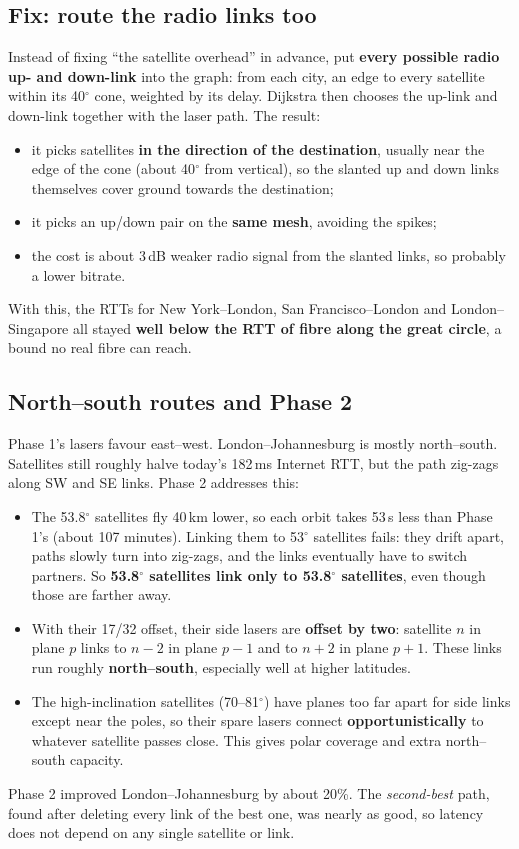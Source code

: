 \subsection{Fix: route the radio links too}
Instead of fixing ``the satellite overhead'' in advance, put \textbf{every possible radio up- and down-link} into the graph: from each city, an edge to every satellite
within its 40$^\circ$ cone, weighted by its delay. Dijkstra then chooses the up-link and down-link together with the laser path. The result:
\begin{itemize}
  \item it picks satellites \textbf{in the direction of the destination}, usually near the edge of the cone (about 40$^\circ$ from vertical), so the slanted up and down
        links themselves cover ground towards the destination;
  \item it picks an up/down pair on the \textbf{same mesh}, avoiding the spikes;
  \item the cost is about 3\,dB weaker radio signal from the slanted links, so probably a lower bitrate.
\end{itemize}
With this, the RTTs for New York--London, San Francisco--London and London--Singapore all stayed \textbf{well below the RTT of fibre along the great circle},
a bound no real fibre can reach.

\subsection{North--south routes and Phase 2}
Phase 1's lasers favour east--west. London--Johannesburg is mostly north--south. Satellites still roughly halve today's 182\,ms Internet RTT, but the path zig-zags
along SW and SE links. Phase 2 addresses this:
\begin{itemize}
  \item The 53.8$^\circ$ satellites fly 40\,km lower, so each orbit takes 53\,s less than Phase 1's (about 107 minutes). Linking them to 53$^\circ$ satellites fails:
        they drift apart, paths slowly turn into zig-zags, and the links eventually have to switch partners. So \textbf{53.8$^\circ$ satellites link only to 53.8$^\circ$
        satellites}, even though those are farther away.
  \item With their 17/32 offset, their side lasers are \textbf{offset by two}: satellite $n$ in plane $p$ links to $n-2$ in plane $p-1$ and to $n+2$ in plane $p+1$. These
        links run roughly \textbf{north--south}, especially well at higher latitudes.
  \item The high-inclination satellites (70--81$^\circ$) have planes too far apart for side links except near the poles, so their spare lasers connect
        \textbf{opportunistically} to whatever satellite passes close. This gives polar coverage and extra north--south capacity.
\end{itemize}
Phase 2 improved London--Johannesburg by about 20\%. The \emph{second-best} path, found after deleting every link of the best one, was nearly as good, so latency does not
depend on any single satellite or link.

